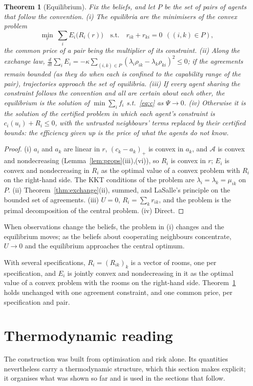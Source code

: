\documentclass[11pt]{article}
\newtheorem{theorem}{Theorem}[section]
\theoremstyle{definition}
\theoremstyle{remark}
\newcommand{\A}{\mathcal{A}}
\begin{document}
\begin{theorem}[Equilibrium]\label{thm:eq}
Fix the beliefs, and let $P$ be the set of pairs of agents that follow the convention.
(i) The equilibria are the minimisers of the convex problem
\[
\min_r\ \sum_iE_i\big(R_i(r)\big)\quad\text{s.t.}\quad r_{ik}+r_{ki}=0\ \ ((i,k)\in P),
\]
the common price of a pair being the multiplier of its constraint.
(ii) Along the exchange law, $\frac{d}{dt}\sum_iE_i=-\kappa\sum_{(i,k)\in P}(\lambda_i\rho_{ik}-\lambda_k\rho_{ki})^2\le0$; if the agreements remain bounded (as they do when each is confined to the capability range of the pair), trajectories approach the set of equilibria.
(iii) If every agent sharing the constraint follows the convention and all are certain about each other, the equilibrium is the solution of $\min\sum_if_i$ s.t.\ \eqref{eq:c} as $\Psi\to0$.
(iv) Otherwise it is the solution of the certified problem in which each agent's constraint is $c_i(u_i)+R_i\le0$, with the untrusted neighbours' terms replaced by their certified bounds: the efficiency given up is the price of what the agents do not know.
\end{theorem}
\begin{proof}
(i) $a_i$ and $a_k$ are linear in $r$, $(c_k-a_k)_+$ is convex in $a_k$, and $\A$ is convex and nondecreasing (Lemma~\ref{lem:props}(iii),(vi)), so $R_i$ is convex in $r$; $E_i$ is convex and nondecreasing in $R_i$ as the optimal value of a convex problem with $R_i$ on the right-hand side. The KKT conditions of the problem are $\lambda_i=\lambda_k=\mu_{ik}$ on $P$. (ii) Theorem~\ref{thm:exchange}(ii), summed, and LaSalle's principle on the bounded set of agreements. (iii) $U=0$, $R_i=\sum_kr_{ik}$, and the problem is the primal decomposition of the central problem. (iv) Direct.
\end{proof}

When observations change the beliefs, the problem in (i) changes and the equilibrium moves; as the beliefs about cooperating neighbours concentrate, $U\to0$ and the equilibrium approaches the central optimum.

With several specifications, $R_i=(R_{ik})_k$ is a vector of rooms, one per specification, and $E_i$ is jointly convex and nondecreasing in it as the optimal value of a convex problem with the rooms on the right-hand side. Theorem~\ref{thm:eq} holds unchanged with one agreement constraint, and one common price, per specification and pair.

\section{Thermodynamic reading}\label{sec:thermo}
The construction was built from optimisation and risk alone. Its quantities nevertheless carry a thermodynamic structure, which this section makes explicit; it organises what was shown so far and is used in the sections that follow.
\end{document}
